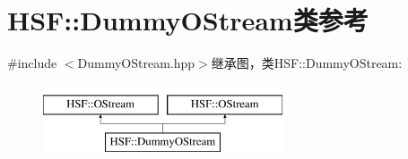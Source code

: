 \hypertarget{classHSF_1_1DummyOStream}{
\section{HSF::DummyOStream类参考}
\label{classHSF_1_1DummyOStream}
}


{\ttfamily \#include $<$DummyOStream.hpp$>$}继承图，类HSF::DummyOStream:\begin{figure}[H]
\begin{center}
\leavevmode
\includegraphics[height=2cm]{classHSF_1_1DummyOStream}
\end{center}
\end{figure}
